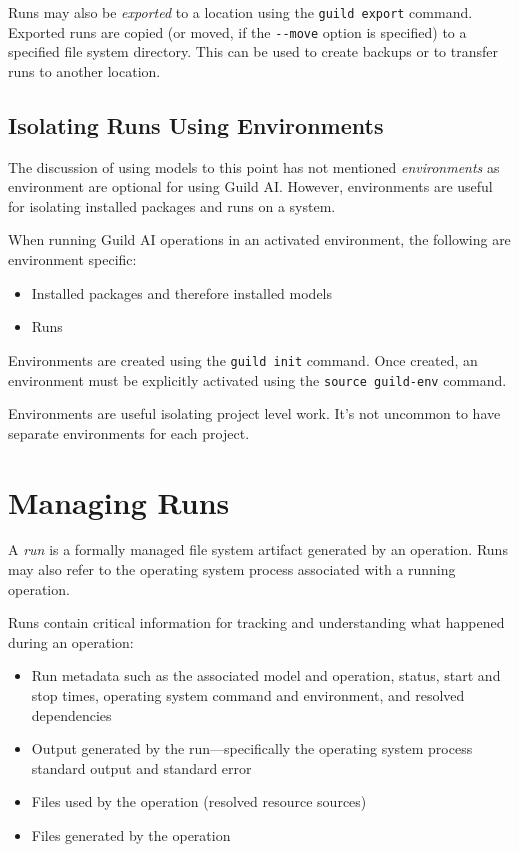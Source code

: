 \documentclass{article}
\begin{document}
Runs may also be \emph{exported} to a location using the
\verb|guild export| command. Exported runs are copied (or moved, if
the \verb|--move| option is specified) to a specified file system
directory. This can be used to create backups or to transfer runs to
another location.

\subsection{Isolating Runs Using Environments}

The discussion of using models to this point has not mentioned
\emph{environments} as environment are optional for using Guild
AI. However, environments are useful for isolating installed packages
and runs on a system.

When running Guild AI operations in an activated environment, the
following are environment specific:

\begin{itemize}
\item Installed packages and therefore installed models
\item Runs
\end{itemize}

Environments are created using the \verb|guild init| command. Once
created, an environment must be explicitly activated using the
\verb|source guild-env| command.

Environments are useful isolating project level work. It's not uncommon
to have separate environments for each project.

\section{Managing Runs}
\label{sec:runs}

A \emph{run} is a formally managed file system artifact generated by
an operation. Runs may also refer to the operating system process
associated with a running operation.

Runs contain critical information for tracking and understanding what
happened during an operation:

\begin{itemize}
\item Run metadata such as the associated model and operation, status,
  start and stop times, operating system command and environment, and
  resolved dependencies
\item Output generated by the run---specifically the operating system
  process standard output and standard error
\item Files used by the operation (resolved resource sources)
\item Files generated by the operation
\end{itemize}
\end{document}
